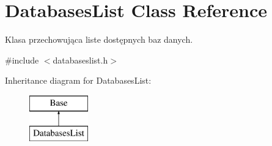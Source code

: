 \hypertarget{class_databases_list}{}\section{Databases\+List Class Reference}
\label{class_databases_list}


Klasa przechowująca liste dostępnych baz danych.  




{\ttfamily \#include $<$databaseslist.\+h$>$}

Inheritance diagram for Databases\+List\+:\begin{figure}[H]
\begin{center}
\leavevmode
\includegraphics[height=2.000000cm]{class_databases_list}
\end{center}
\end{figure}
